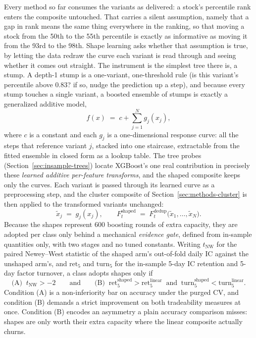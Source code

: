 \documentclass[11pt]{article}
\begin{document}
Every method so far consumes the variants as delivered: a stock's percentile rank enters
the composite untouched. That carries a silent assumption, namely that a gap in rank
means the same thing everywhere in the ranking, so that moving a stock from the 50th to
the 55th percentile is exactly as informative as moving it from the 93rd to the 98th.
Shape learning asks whether that assumption is true, by letting the data redraw the curve
each variant is read through and seeing whether it comes out straight. The instrument is
the simplest tree there is, a stump. A depth-1 stump is a one-variant, one-threshold rule (is this
variant's percentile above 0.83? if so, nudge the prediction up a step), and because
every stump touches a single variant, a boosted ensemble of stumps is exactly a
generalized additive model,
\begin{equation}
f(x) \;=\; c + \sum_{j=1}^{N} g_j(x_j),
\label{eq:gam}
\end{equation}
where $c$ is a constant and each $g_j$ is a one-dimensional response curve: all the
steps that reference variant $j$, stacked into one staircase, extractable from the fitted
ensemble in closed form as a lookup table. The tree probes (Section~\ref{sec:insample-trees}) locate XGBoost's one real
contribution in precisely these \emph{learned additive per-feature transforms}, and the
shaped composite keeps only the curves. Each variant is passed through its learned curve
as a preprocessing step, and the cluster composite of
Section~\ref{sec:methods-cluster} is then applied to the transformed variants unchanged:
\begin{equation}
\tilde{x}_j \;=\; g_j(x_j), \qquad
F^{\text{shaped}}_t \;=\; F^{\text{dedup}}_t\bigl(\tilde{x}_1,\dots,\tilde{x}_N\bigr).
\label{eq:shaped}
\end{equation}
Because the shapes represent 600 boosting rounds of extra capacity, they are adopted per
class only behind a mechanical \emph{evidence gate}, defined from in-sample quantities
only, with two stages and no tuned constants. Writing $t_{\mathrm{NW}}$ for the paired
Newey--West statistic of the shaped arm's out-of-fold daily IC against the unshaped
arm's, and $\mathrm{ret}_5$ and $\mathrm{turn}_5$ for the in-sample 5-day IC retention
and 5-day factor turnover, a class adopts shapes only if
\begin{equation}
\text{(A)}\;\; t_{\mathrm{NW}} > -2
\qquad\text{and}\qquad
\text{(B)}\;\; \mathrm{ret}_5^{\text{shaped}} > \mathrm{ret}_5^{\text{linear}}
\;\;\text{and}\;\;
\mathrm{turn}_5^{\text{shaped}} < \mathrm{turn}_5^{\text{linear}}.
\label{eq:gate}
\end{equation}
Condition (A) is a non-inferiority bar on accuracy under the purged CV, and condition
(B) demands a strict improvement on both tradeability measures at once. Condition (B)
encodes an asymmetry a plain accuracy comparison misses: shapes are only worth their
extra capacity where the linear composite actually churns.
\end{document}
